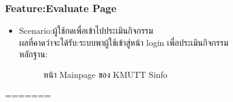 \documentclass[14pt,oneside,openright,a4paper]{cpe-thai-project}
\begin{document}
\subsubsection{Feature:Evaluate Page}
\begin{itemize}
  \item Scenario:ผู้ใช้กดเพื่อเข้าไปประเมินกิจกรรม\\ผลที่คาดว่าจะได้รับ:ระบบพาผู้ใช้เข้าสู่หน้า login เพื่อประเมินกิจกรรม\\หลักฐาน:\\
  \begin{figure}[!h]\centering
    \setlength{\fboxrule}{0.5mm} %
    \setlength{\fboxsep}{0.5cm}
    \caption{หน้า Mainpage ของ KMUTT Sinfo}\label{fig:sinfo}
  \end{figure}
\end{itemize}
=======
\end{document}
